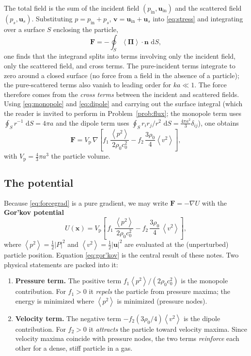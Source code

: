 \documentclass[11pt]{article}
\newcommand{\rrho}{\rho_{0}}
\newcommand{\cc}{c_{0}}
\newcommand{\vp}{V_{\mathrm{p}}}
\newcommand{\avg}[1]{\left\langle #1 \right\rangle}
\newcommand{\vpSq}{\avg{p^{2}}}
\newcommand{\vvSq}{\avg{v^{2}}}
\newcommand{\dd}{\,\mathrm{d}}
\newcommand{\uu}{\mathbf{u}}
\newcommand{\vv}{\mathbf{v}}
\newcommand{\nn}{\mathbf{n}}
\newcommand{\xx}{\mathbf{x}}
\begin{document}
The total field is the sum of the incident field $(p_{\mathrm{in}},\uu_{\mathrm{in}})$
and the scattered field $(p_{s},\uu_{s})$. Substituting
$p=p_{\mathrm{in}}+p_{s}$, $\vv=\uu_{\mathrm{in}}+\uu_{s}$ into
\eqref{eq:stress} and integrating over a surface $S$ enclosing the particle,
\begin{equation}
  \mathbf{F}=-\oint_{S}\avg{\boldsymbol{\Pi}}\cdot\nn\,\dd S,
\end{equation}
one finds that the integrand splits into terms involving only the incident
field, only the scattered field, and cross terms. The pure-incident terms
integrate to zero around a closed surface (no force from a field in the absence
of a particle); the pure-scattered terms also vanish to leading order for
$ka\ll1$. The force therefore comes from the \emph{cross terms} between the
incident and scattered fields. Using \eqref{eq:monopole} and \eqref{eq:dipole}
and carrying out the surface integral (which the reader is invited to perform in
Problem~\ref{prob:flux}; the monopole term uses
$\oint_{S}r^{-1}\,\dd S=4\pi a$ and the dipole term uses
$\oint_{S}r_{i}r_{j}/r^{2}\,\dd S=\frac{4\pi a^{2}}{3}\delta_{ij}$), one obtains
\begin{equation}
  \mathbf{F}=\vp\,\nabla\!\left[
     f_{1}\,\frac{\vpSq}{2\rrho\cc^{2}}
    -f_{2}\,\frac{3\rrho}{4}\vvSq
  \right],
  \label{eq:forcegrad}
\end{equation}
with $\vp=\frac{4}{3}\pi a^{3}$ the particle volume.

\subsection{The potential}

Because \eqref{eq:forcegrad} is a pure gradient, we may write
$\mathbf{F}=-\nabla U$ with the \textbf{Gor'kov potential}
\begin{equation}
  \boxed{
  U(\xx)=\vp\left[\,
      f_{1}\,\frac{\vpSq}{2\rrho\cc^{2}}
      -f_{2}\,\frac{3\rrho}{4}\,\vvSq
  \right],
  }
  \label{eq:gor'kov}
\end{equation}
where $\vpSq=\tfrac12|P|^{2}$ and $\vvSq=\tfrac12|\uu|^{2}$ are evaluated at the
(unperturbed) particle position. Equation \eqref{eq:gor'kov} is the central
result of these notes. Two physical statements are packed into it:

\begin{enumerate}[label=(\roman*)]
  \item \textbf{Pressure term.} The positive term
  $f_{1}\vpSq/(2\rrho\cc^{2})$ is the monopole contribution. For $f_{1}>0$ it
  \emph{repels} the particle from pressure maxima; the energy is minimized where
  $\vpSq$ is minimized (pressure nodes).
  \item \textbf{Velocity term.} The negative term $-f_{2}(3\rrho/4)\vvSq$ is the
  dipole contribution. For $f_{2}>0$ it \emph{attracts} the particle toward
  velocity maxima. Since velocity maxima coincide with pressure nodes, the two
  terms \emph{reinforce} each other for a dense, stiff particle in a gas.
\end{enumerate}
\end{document}
